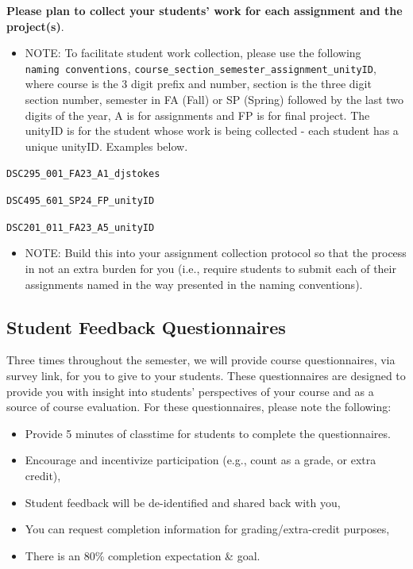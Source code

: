 \documentclass[
]{book}
\providecommand{\tightlist}{%
  \setlength{\itemsep}{0pt}\setlength{\parskip}{0pt}}
\begin{document}
{ \textbf{Please plan to collect your students' work for each assignment and the project(s)}. }

\begin{itemize}
\tightlist
\item
  NOTE: To facilitate student work collection, please use the following \texttt{naming\ conventions}, \texttt{course\_section\_semester\_assignment\_unityID}, where course is the 3 digit prefix and number, section is the three digit section number, semester in FA (Fall) or SP (Spring) followed by the last two digits of the year, A is for assignments and FP is for final project. The unityID is for the student whose work is being collected - each student has a unique unityID. Examples below.
\end{itemize}

\texttt{DSC295\_001\_FA23\_A1\_djstokes}

\texttt{DSC495\_601\_SP24\_FP\_unityID}

\texttt{DSC201\_011\_FA23\_A5\_unityID}

\begin{itemize}
\tightlist
\item
  NOTE: Build this into your assignment collection protocol so that the process in not an extra burden for you (i.e., require students to submit each of their assignments named in the way presented in the naming conventions).
\end{itemize}

\hypertarget{student-feedback-questionnaires}{%
\subsection{Student Feedback Questionnaires}\label{student-feedback-questionnaires}}

Three times throughout the semester, we will provide course questionnaires, via survey link, for you to give to your students. These questionnaires are designed to provide you with insight into students' perspectives of your course and as a source of course evaluation. For these questionnaires, please note the following:

\begin{itemize}
\tightlist
\item
  Provide 5 minutes of classtime for students to complete the questionnaires.
\item
  Encourage and incentivize participation (e.g., count as a grade, or extra credit),
\item
  Student feedback will be de-identified and shared back with you,
\item
  You can request completion information for grading/extra-credit purposes,
\item
  There is an 80\% completion expectation \& goal.
\end{itemize}
\end{document}
